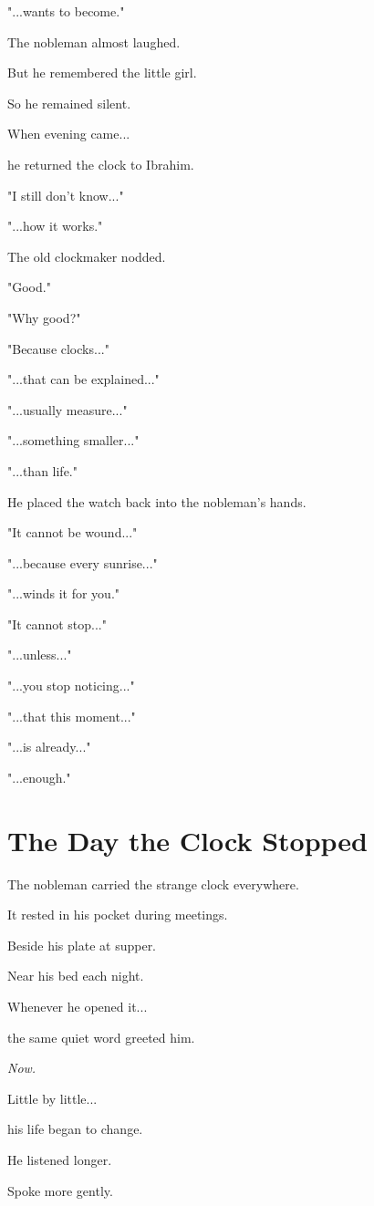 \documentclass[12pt,openany]{book}
\begin{document}
"...wants to become."

The nobleman almost laughed.

But he remembered the little girl.

So he remained silent.

When evening came...

he returned the clock to Ibrahim.

"I still don't know..."

"...how it works."

The old clockmaker nodded.

"Good."

"Why good?"

"Because clocks..."

"...that can be explained..."

"...usually measure..."

"...something smaller..."

"...than life."

He placed the watch back into the nobleman's hands.

"It cannot be wound..."

"...because every sunrise..."

"...winds it for you."

"It cannot stop..."

"...unless..."

"...you stop noticing..."

"...that this moment..."

"...is already..."

"...enough."
\section*{The Day the Clock Stopped}

The nobleman carried the strange clock everywhere.

It rested in his pocket during meetings.

Beside his plate at supper.

Near his bed each night.

Whenever he opened it...

the same quiet word greeted him.

\emph{Now.}

Little by little...

his life began to change.

He listened longer.

Spoke more gently.
\end{document}
